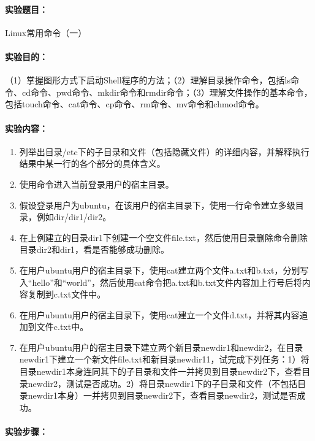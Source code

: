 \documentclass[cs4size,a4paper,nofonts]{ctexart}
\begin{document}




\paragraph{实验题目：}Linux常用命令（一）

\paragraph{实验目的：}（1）掌握图形方式下启动Shell程序的方法；（2）理解目录操作命令，包括ls命令、cd命令、pwd命令、mkdir命令和rmdir命令；（3）理解文件操作的基本命令，包括touch命令、cat命令、cp命令、rm命令、mv命令和chmod命令。

\paragraph{实验内容：}
\begin{enumerate}
\item 列举出目录/etc下的子目录和文件（包括隐藏文件）的详细内容，并解释执行结果中某一行的各个部分的具体含义。
\item 使用命令进入当前登录用户的宿主目录。
\item 假设登录用户为ubuntu，在该用户的宿主目录下，使用一行命令建立多级目录，例如dir/dir1/dir2。
\item 在上例建立的目录dir1下创建一个空文件file.txt，然后使用目录删除命令删除目录dir2和dir1，看是否能够成功删除。
\item 在用户ubuntu用户的宿主目录下，使用cat建立两个文件a.txt和b.txt，分别写入“hello”和“world”，然后使用cat命令把a.txt和b.txt文件内容加上行号后将内容复制到c.txt文件中。
\item 在用户ubuntu用户的宿主目录下，使用cat建立一个文件d.txt，并将其内容追加到文件c.txt中。
\item 在用户ubuntu用户的宿主目录下建立两个新目录newdir1和newdir2，在目录newdir1下建立一个新文件file.txt和新目录newdir11，试完成下列任务：1）将目录newdir1本身连同其下的子目录和文件一并拷贝到目录newdir2下，查看目录newdir2，测试是否成功。2）将目录newdir1下的子目录和文件（不包括目录newdir1本身）一并拷贝到目录newdir2下，查看目录newdir2，测试是否成功。
\end{enumerate}

\paragraph{实验步骤：}
\end{document}
